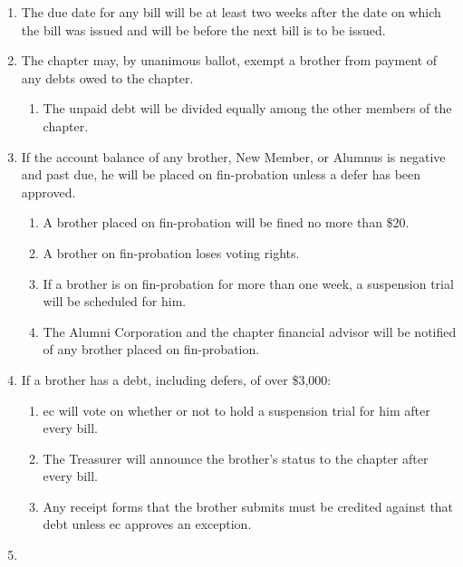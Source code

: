 \documentclass[]{article}
\begin{document}
	\begin{enumerate}
		\item The due date for any bill will be at least two weeks after the date on which the bill was issued and will be before the next bill is to be issued.

		\item The chapter may, by unanimous ballot, exempt a brother from payment of any debts owed to the chapter.
			\begin{enumerate}
				\item The unpaid debt will be divided equally among the other members of the chapter.
			\end{enumerate}

		\item If the account balance of any brother, New Member, or Alumnus is negative and past due, he will be placed on \gls{fin-probation} unless a \gls{defer} has been approved.
		\label{fin-probation}
			\begin{enumerate}
				\item A brother placed on \gls{fin-probation} will be fined no more than \$20.
				\item A brother on \gls{fin-probation} loses voting rights.
				\item If a brother is on \gls{fin-probation} for more than one week, a suspension trial will be scheduled for him.
				\item The Alumni Corporation and the chapter financial advisor will be notified of any brother placed on \gls{fin-probation}.
			\end{enumerate}

		\item If a brother has a debt, including \glspl{defer}, of over \$3,000:
			\begin{enumerate}
				\item \Gls{ec} will vote on whether or not to hold a suspension trial for him after every bill.
				\item The Treasurer will announce the brother's status to the chapter after every bill.
				\item Any receipt forms that the brother submits must be credited against that debt unless \gls{ec} approves an exception.
			\end{enumerate}
		\item
	\end{enumerate}
   
\end{document}
